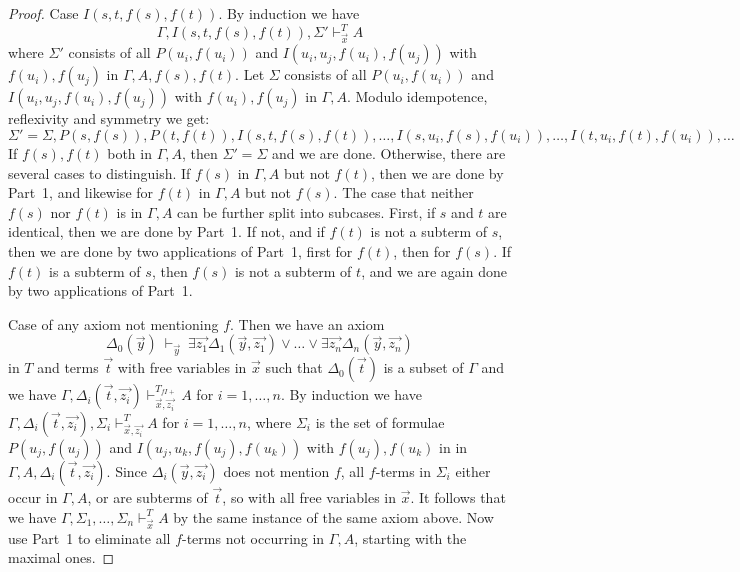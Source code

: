 \documentclass{fundam}
\begin{document}
\begin{proof}
Case $I(s,t,f(s),f(t))$. By induction we have 
\begin{equation}\label{ih:Istfsft}
\Gamma,I(s,t,f(s),f(t)),\Sigma'\vdash_{\vec{x}}^{T} A
\end{equation}
where $\Sigma'$ consists of all $P(u_i,f(u_i))$ and $I(u_i,u_j,f(u_i),f(u_j))$
with $f(u_i),f(u_j)$ in $\Gamma,A,f(s),f(t)$. 
Let $\Sigma$ consists of all $P(u_i,f(u_i))$ and $I(u_i,u_j,f(u_i),f(u_j))$
with $f(u_i),f(u_j)$ in $\Gamma,A$.
Modulo idempotence, reflexivity and symmetry we get:
\begin{equation}\label{eq:sigmas}
\Sigma' = \Sigma,P(s,f(s)),P(t,f(t)),I(s,t,f(s),f(t)),\ldots,I(s,u_i,f(s),f(u_i)),\ldots,I(t,u_i,f(t),f(u_i)),\ldots
\end{equation}
If $f(s),f(t)$ both in $\Gamma,A$,
then $\Sigma'=\Sigma$ and we are done. Otherwise, there are several cases
to distinguish. If $f(s)$ in $\Gamma,A$ but not $f(t)$, then we are done by Part~1,
and likewise for $f(t)$ in $\Gamma,A$ but not $f(s)$. The case that neither
$f(s)$ nor $f(t)$ is in $\Gamma,A$ can be further split into subcases. First, if $s$ and $t$
are identical, then we are done by Part~1. If not, and if $f(t)$ is not a subterm of $s$,
then we are done by two applications of Part~1, first for $f(t)$, then for $f(s)$.
If $f(t)$ is a subterm of $s$, then $f(s)$ is not a subterm of $t$, and we are 
again done by two applications of Part~1.

Case of any axiom not mentioning $f$. Then we have an axiom
$$
\Delta_0(\vec{y})~\vdash_{\vec{y}}~
\exists \vec{z_1}\Delta_1(\vec{y},\vec{z_1})\vee\dots\vee\exists \vec{z_n}\Delta_n(\vec{y},\vec{z_n})
$$
in $T$ and terms $\vec{t}$ with free variables in $\vec{x}$ such
that $\Delta_0(\vec{t})$ is a subset of $\Gamma$ and we have
$\Gamma,\Delta_i(\vec{t},\vec{z_i})\vdash_{\vec{x},\vec{z_i}}^{T_{f\!I\!{+}}} A$ 
for $i=1,\dots,n$.
By induction we have $\Gamma,\Delta_i(\vec{t},\vec{z_i}), \Sigma_i\vdash_{\vec{x},\vec{z_i}}^{T} A$
for $i = 1,\dots,n$, where $\Sigma_i$ is the set of formulae $P(u_j,f(u_j))$ and $I(u_j,u_k,f(u_j),f(u_k))$
with $f(u_j),f(u_k)$ in in $\Gamma,A,\Delta_i(\vec{t},\vec{z_i})$.
Since $\Delta_i(\vec{y},\vec{z_i})$ does not mention $f$, all $f$-terms in
$\Sigma_i$  either occur in $\Gamma,A$, or are subterms of $\vec{t}$, so with
all free variables in $\vec{x}$. It follows that we have
$\Gamma,\Sigma_1,\dots,\Sigma_n\vdash_{\vec{x}}^{T} A$
by the same instance of the same axiom above. Now use Part~1 to eliminate
all $f$-terms not occurring in $\Gamma,A$, starting with the maximal ones.
\end{proof}
\end{document}
